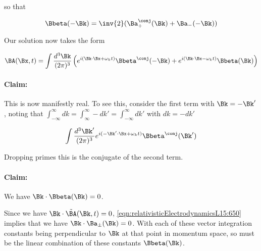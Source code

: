 so that

\begin{equation}\label{eqn:relativisticElectrodynamicsL15:710}
\Bbeta(-\Bk) = \inv{2} (\Ba_{+}^\conj(\Bk) + \Ba_{-}(-\Bk))
\end{equation}

Our solution now takes the form

\begin{equation}\label{eqn:relativisticElectrodynamicsL15:730}
\BA(\Bx, t) = \int \frac{d^3\Bk}{(2 \pi)^3} \left( 
e^{i (\Bk \cdot \Bx + \omega_k t)} \Bbeta^\conj(-\Bk)
+e^{i (\Bk \cdot \Bx - \omega_k t)} \Bbeta(\Bk)
\right)
\end{equation}

\paragraph{Claim:}

This is now manifestly real.  To see this, consider the first term with $\Bk = -\Bk'$, noting that $\int_{-\infty}^\infty dk = \int_{\infty}^\infty -dk' = \int_{-\infty}^\infty dk' $ with $dk = -dk'$

\begin{equation}\label{eqn:relativisticElectrodynamicsL15:860}
\int \frac{d^3\Bk'}{(2 \pi)^3} e^{i (-\Bk' \cdot \Bx + \omega_k t)} \Bbeta^\conj(\Bk')
\end{equation}

Dropping primes this is the conjugate of the second term.

\paragraph{Claim:}

We have $\Bk \cdot \Bbeta(\Bk)  = 0$.

Since we have $\Bk \cdot \tilde{\BA}(\Bk, t) = 0$, \ref{eqn:relativisticElectrodynamicsL15:650} implies that we have $\Bk \cdot \Ba_{\pm}(\Bk) = 0$.  With each of these vector integration constants being perpendicular to $\Bk$ at that point in momentum space, so must be the linear combination of these constants $\Bbeta(\Bk)$.

\EndArticle
